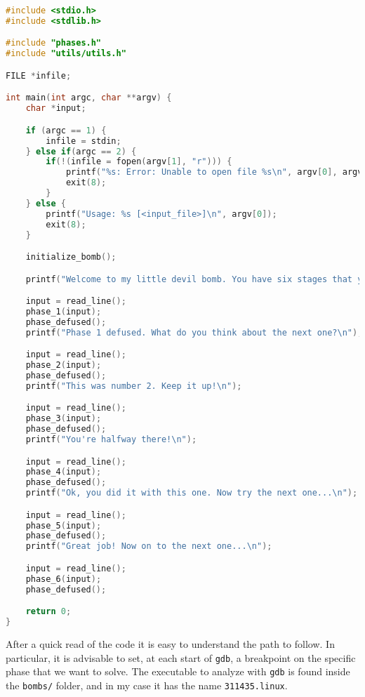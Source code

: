 \documentclass[a4paper,12pt]{report}  %
\newcommand{\lstinlinebg}[1]{\colorbox{backcolour}{\lstinline|#1|}}
\begin{document}
\begin{lstlisting}[language=C,keywords={FILE, int, char, fopen, exit, printf, if, else, return, stdin}]
#include <stdio.h>
#include <stdlib.h>

#include "phases.h"
#include "utils/utils.h"

FILE *infile;

int main(int argc, char **argv) {
    char *input;

    if (argc == 1) {
        infile = stdin;
    } else if(argc == 2) {
        if(!(infile = fopen(argv[1], "r"))) {
            printf("%s: Error: Unable to open file %s\n", argv[0], argv[1]);
            exit(8);
        }
    } else {
        printf("Usage: %s [<input_file>]\n", argv[0]);
        exit(8);
    }

    initialize_bomb();

    printf("Welcome to my little devil bomb. You have six stages that you can use to blow yourself up. Have a great day!\n");

    input = read_line();
    phase_1(input);     
    phase_defused();    
    printf("Phase 1 defused. What do you think about the next one?\n");

    input = read_line();
    phase_2(input);
    phase_defused();
    printf("This was number 2. Keep it up!\n");

    input = read_line();
    phase_3(input);
    phase_defused();
    printf("You're halfway there!\n");

    input = read_line();
    phase_4(input);
    phase_defused();
    printf("Ok, you did it with this one. Now try the next one...\n");

    input = read_line();
    phase_5(input);
    phase_defused();
    printf("Great job! Now on to the next one...\n");

    input = read_line();
    phase_6(input);
    phase_defused();

    return 0;
}   
\end{lstlisting}

After a quick read of the code it is easy to understand the path to follow.
In particular, it is advisable to set, at each start of \lstinlinebg{gdb}, a breakpoint on the specific phase that we want to solve.
The executable to analyze with \lstinlinebg{gdb} is found inside the \lstinlinebg{bombs/} folder, and in my case it has the name \lstinlinebg{311435.linux}.
\end{document}
